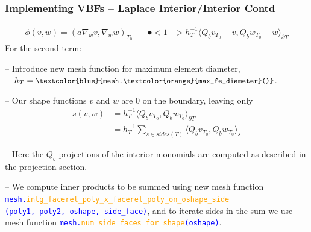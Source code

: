 \documentclass[compress]{beamer}
\begin{document}
\begin{frame}
  \frametitle{Implementing VBFs -- Laplace Interior/Interior Contd}
  \vspace{-.5cm}
  \begin{align*}
   \mathfrak \phi(v,w) = (a \nabla_w v,\nabla_w w)_{\scriptscriptstyle T_0} \;+\; 
   \spot<1->{h_T^{-1}\langle Q_b v_{\scriptscriptstyle T_0} - v,Q_b w_{\scriptscriptstyle T_0} - w \rangle_{\partial T}}
  \end{align*}
  For the second term:\\
  \uncover<+-> {
  -- Introduce new mesh function for maximum element diameter,
     $\quad h_T = \texttt{\small \textcolor{blue}{mesh.\textcolor{orange}{max\_fe\_diameter}()}}$.
  
  \uncover<+-> {
  -- Our shape functions $v$ and $w$ are $0$ on the boundary, leaving only 
  \begin{align*}
    s(v,w) &= h_T^{-1} \langle Q_b v_{\scriptscriptstyle T_0}, Q_b w_{\scriptscriptstyle T_0} \rangle_{\partial T}\\
           &= h_T^{-1} \sum_{s \in sides(T)} \langle Q_b v_{\scriptscriptstyle T_0}, Q_b w_{\scriptscriptstyle T_0} \rangle_{s}
  \end{align*}
  
  \uncover<+-> {
  -- Here the $Q_b$ projections of the interior monomials are computed as described in the projection section.
  
  \uncover<+-> {
  -- We compute inner products to be summed using new mesh function\\
  \texttt{\small \textcolor{blue}{mesh.\textcolor{orange}{intg\_facerel\_poly\_x\_facerel\_poly\_on\_oshape\_side}\\
  \hspace{0.75cm}(poly1, poly2, oshape, side\_face)}}, and to iterate sides in the sum we use mesh function
  \texttt{\small \textcolor{blue}{mesh.\textcolor{orange}{num\_side\_faces\_for\_shape}(oshape)}}.
  }}}}
\end{frame}
\end{document}
